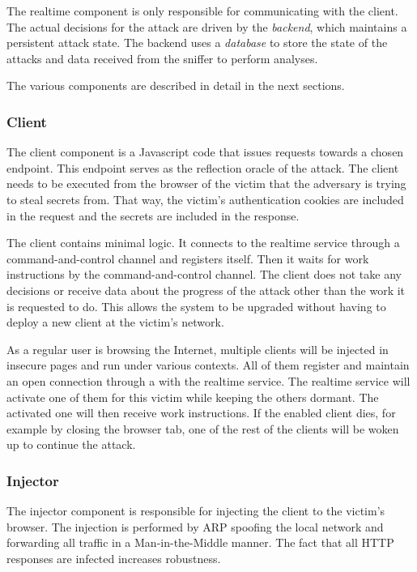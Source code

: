 The realtime component is only responsible for communicating with the client.
The actual decisions for the attack are driven by the \textit{backend}, which
maintains a persistent attack state. The backend uses a \textit{database} to
store the state of the attacks and data received from the sniffer to perform
analyses.

The various components are described in detail in the next sections.

\subsubsection{Client}

The client component is a Javascript code that issues requests towards a chosen
endpoint. This endpoint serves as the reflection oracle of the attack. The client
needs to be executed from the browser of the victim that the adversary is trying
to steal secrets from. That way, the victim's authentication cookies are
included in the request and the secrets are included in the
response.

The client contains minimal logic. It connects to the realtime service through
a command-and-control channel and registers itself. Then it waits
for work instructions by the command-and-control channel. The
client does not take any decisions or receive data about the progress of the
attack other than the work it is requested to do.
This allows the system to be upgraded without having to deploy a
new client at the victim's network.

As a regular user is browsing the Internet, multiple clients will be
injected in insecure pages and run under various contexts. All of
them register and maintain an open connection through a
with the realtime service. The realtime
service will activate one of them for this victim while keeping the others
dormant. The activated one will then receive work instructions. If the enabled
client dies, for example by closing the browser
tab, one of the rest of the clients will be woken up to continue the
attack.

\subsubsection{Injector}

The injector component is responsible for injecting the client to the victim's
browser. The injection is performed by ARP spoofing the local
network and forwarding all traffic in a Man-in-the-Middle manner. The fact that all HTTP
responses are infected increases robustness.

